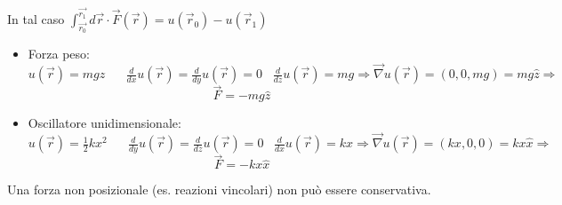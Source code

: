 In tal caso $\int_{\vec{r_0}}^{\vec{r_1}} d\vec{r} \cdot \vec{F}(\vec{r}) = u(\vec{r}_0) - u(\vec{r}_1)$
\begin{itemize}
    \item Forza peso: $u(\vec{r}) = mgz \hspace{20pt} \frac{d}{dx}u(\vec{r}) = \frac{d}{dy}u(\vec{r}) = 0 \hspace{10pt} \frac{d}{dz}u(\vec{r}) = mg \Rightarrow \vec{\nabla}u(\vec{r}) = (0,0, mg)= mg\hat{z} \Rightarrow$
    $$ \vec{F}= -mg\hat{z}$$
    \item Oscillatore unidimensionale: $u(\vec{r}) = \frac{1}{2}kx^2 \hspace{20pt} \frac{d}{dy}u(\vec{r}) = \frac{d}{dz} u(\vec{r}) = 0 \hspace{10pt} \frac{d}{dx}u(\vec{r}) = kx \Rightarrow \vec{\nabla}u(\vec{r}) = (kx, 0, 0) = kx\hat{x} \Rightarrow$
    $$ \vec{F} = -kx\hat{x}$$
\end{itemize}
\begin{observation}
    Una forza non posizionale (es. reazioni vincolari) non può essere conservativa.
\end{observation}

